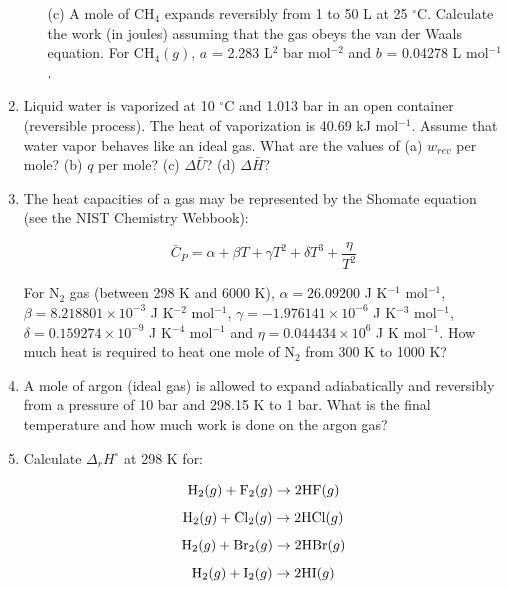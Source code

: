 \begin{enumerate}
\begin{itemize}
\item[(c)] A mole of CH$_4$ expands reversibly from 1 to 50 L at 25 $^\circ$C. Calculate the work (in joules) assuming that the gas obeys the van der Waals equation. For CH$_4(g)$, $a$ = 2.283 L$^2$ bar mol$^{-2}$ and $b$ = 0.04278 L mol$^{-1}$.

\end{itemize}


\item Liquid water is vaporized at 10 $^\circ$C and 1.013 bar in an open container (reversible process). The heat of vaporization is 40.69 kJ mol$^{-1}$. Assume that water vapor behaves like an ideal gas. What are the values of (a) $w_{rev}$ per mole? (b) $q$ per mole? (c) $\Delta \bar{U}$? (d) $\Delta \bar{H}$?


\item The heat capacities of a gas may be represented by the Shomate equation (see the NIST Chemistry Webbook):

$$\bar{C}_P = \alpha + \beta T + \gamma T^2 + \delta T^3 + \frac{\eta}{T^2}$$

For N$_2$ gas (between 298 K and 6000 K), $\alpha = 26.09200$ J K$^{-1}$ mol$^{-1}$, $\beta = 8.218801\times 10^{-3}$ J K$^{-2}$ mol$^{-1}$, $\gamma = -1.976141\times 10^{-6}$ J K$^{-3}$ mol$^{-1}$, $\delta = 0.159274\times 10^{-9}$ J K$^{-4}$ mol$^{-1}$ and $\eta = 0.044434\times 10^{6}$ J K mol$^{-1}$. How much heat is required to heat one mole of N$_2$ from 300 K to 1000 K?


\item A mole of argon (ideal gas) is allowed to expand adiabatically and reversibly from a pressure of 10 bar and 298.15 K to 1 bar. What is the final temperature and how much work is done on the argon gas?


\item Calculate $\Delta_rH^\circ$ at 298 K for:

$$\textnormal{H}_2(g) + \textnormal{F}_2(g) \rightarrow 2\textnormal{HF}(g)$$
$$\textnormal{H}_2(g) + \textnormal{Cl}_2(g) \rightarrow 2\textnormal{HCl}(g)$$
$$\textnormal{H}_2(g) + \textnormal{Br}_2(g) \rightarrow 2\textnormal{HBr}(g)$$
$$\textnormal{H}_2(g) + \textnormal{I}_2(g) \rightarrow 2\textnormal{HI}(g)$$


\end{enumerate}
